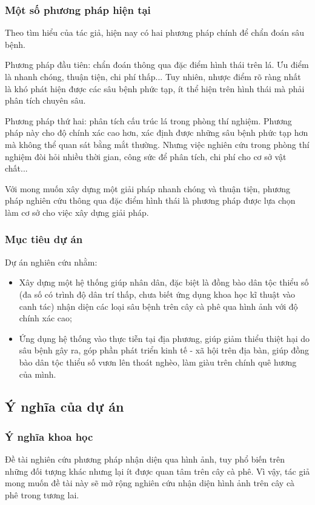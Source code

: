 \documentclass[a4paper,14pt]{extarticle}
\begin{document}
		\subsubsection{Một số phương pháp hiện tại}
		Theo tìm hiểu của tác giả, hiện nay có hai phương pháp chính để chẩn đoán sâu bệnh.
		
		Phương pháp đầu tiên: chẩn đoán thông qua đặc điểm hình thái trên lá. Ưu điểm là nhanh chóng, thuận tiện, chi phí thấp... Tuy nhiên, nhược điểm rõ ràng nhất là khó phát hiện được các sâu bệnh phức tạp, ít thể hiện trên hình thái mà phải phân tích chuyên sâu.
		
		Phương pháp thứ hai: phân tích cấu trúc lá trong phòng thí nghiệm. Phương pháp này cho độ chính xác cao hơn, xác định được những sâu bệnh phức tạp hơn mà không thể quan sát bằng mắt thường. Nhưng việc nghiên cứu trong phòng thí nghiệm đòi hỏi nhiều thời gian, công sức để phân tích, chi phí cho cơ sở vật chất...
		
		Với mong muốn xây dựng một giải pháp nhanh chóng và thuận tiện, phương pháp nghiên cứu thông qua đặc điểm hình thái là phương pháp được lựa chọn làm cơ sở cho việc xây dựng giải pháp.

		\subsubsection{Mục tiêu dự án}
		Dự án nghiên cứu nhằm:
		\begin{itemize}
			\item Xây dựng một hệ thống giúp nhân dân, đặc biệt là đồng bào dân tộc thiểu số (đa số có trình độ dân trí thấp, chưa biết ứng dụng khoa học kĩ thuật vào canh tác) nhận diện các loại sâu bệnh trên cây cà phê qua hình ảnh với độ chính xác cao;
			\item Ứng dụng hệ thống vào thực tiễn tại địa phương, giúp giảm thiểu thiệt hại do sâu bệnh gây ra, góp phần phát triển kinh tế - xã hội trên địa bàn, giúp đồng bào dân tộc thiểu số vươn lên thoát nghèo, làm giàu trên chính quê hương của mình.
		\end{itemize}
			
	\subsection{Ý nghĩa của dự án}
		\subsubsection{Ý nghĩa khoa học}
		Đề tài nghiên cứu phương pháp nhận diện qua hình ảnh, tuy phổ biến trên những đối tượng khác nhưng lại ít được quan tâm trên cây cà phê. Vì vậy, tác giả mong muốn đề tài này sẽ mở rộng nghiên cứu nhận diện hình ảnh trên cây cà phê trong tương lai.
\end{document}
